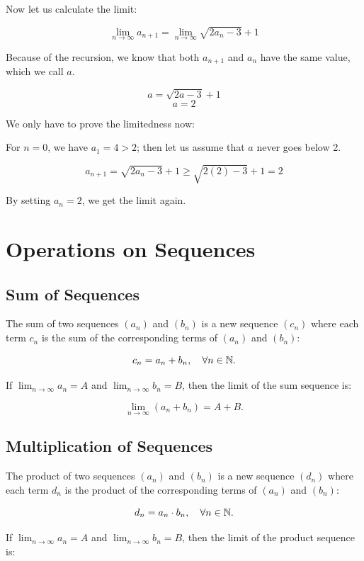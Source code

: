 \QED

Now let us calculate the limit:

\[
	\lim_{n \rightarrow \infty} a_{n + 1} = \lim_{n \rightarrow \infty} \sqrt{2a_n - 3} + 1
\]

Because of the recursion, we know that both \(a_{n + 1}\) and \(a_n\) have the same value,
which we call \(a\).

\[
	a = \sqrt{2a -3} +1
\]
\[
	a = 2
\]

We only have to prove the limitedness now:

For \(n = 0\), we have \(a_1 = 4 > 2\); then let us assume that \(a\) never goes below 2.

\[
	a_{n + 1} = \sqrt{2a_n - 3} + 1 \ge \sqrt{2(2) - 3} + 1 = 2
\]

By setting \(a_n = 2\), we get the limit again.

\QED

\section{Operations on Sequences}

\subsection{Sum of Sequences}

The sum of two sequences \((a_n)\) and \((b_n)\) is a new sequence \((c_n)\) where each term
\(c_n\) is the sum of the corresponding terms of \((a_n)\) and \((b_n)\):

\[
	c_n = a_n + b_n, \quad \forall n \in \mathbb{N}.
\]

If \(\lim_{n \to \infty} a_n = A\) and \(\lim_{n \to \infty} b_n = B\), then the limit of the sum sequence is:

\[
	\lim_{n \to \infty} (a_n + b_n) = A + B.
\]

\subsection{Multiplication of Sequences}

The product of two sequences \((a_n)\) and \((b_n)\) is a new sequence \((d_n)\) where each term \(d_n\)
is the product of the corresponding terms of \((a_n)\) and \((b_n)\):

\[
	d_n = a_n \cdot b_n, \quad \forall n \in \mathbb{N}.
\]

If \(\lim_{n \to \infty} a_n = A\) and \(\lim_{n \to \infty} b_n = B\), then the limit of the product sequence is:


